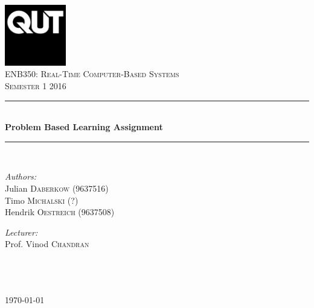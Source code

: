 \begin{titlepage}

\begin{center}


\includegraphics[width=0.20\textwidth]{./media/QUT_Square_black.jpg}\\[1cm]    

\textsc{\LARGE ENB350: Real-Time Computer-Based Systems}\\[1.5cm]

\textsc{\Large Semester 1 2016}\\[0.5cm]


\newcommand{\HRule}{\rule{\linewidth}{0.5mm}}
\HRule \\[0.6cm]
{ \huge \bfseries Problem Based Learning Assignment}\\[0.4cm]

\HRule \\[1.5cm]

\begin{minipage}{0.4\textwidth}
\begin{flushleft} \large
\emph{Authors:}\\
Julian \textsc{Daberkow} (9637516)\\
Timo \textsc{Michalski} (?)\\
Hendrik \textsc{Oestreich} (9637508)
\end{flushleft}
\end{minipage}
\hfill
\begin{minipage}{0.4\textwidth}
\begin{flushright} \large
\emph{Lecturer:} \\
Prof. Vinod \textsc{Chandran}\\
\hfill\\
\hfill\\
\hfill\\
\end{flushright}
\end{minipage}

\vfill

{\large \today}

\end{center}

\end{titlepage}
